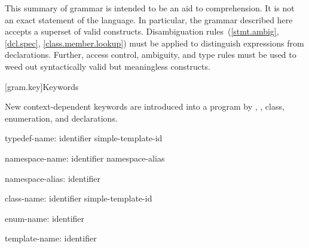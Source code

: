 
\pnum
{}%
%
This summary of \Cpp{} grammar is intended to be an aid to comprehension.
It is not an exact statement of the language.
In particular, the grammar described here accepts
a superset of valid \Cpp{} constructs.
Disambiguation rules~(\ref{stmt.ambig}, \ref{dcl.spec}, \ref{class.member.lookup})
must be applied to distinguish expressions from declarations.
Further, access control, ambiguity, and type rules must be used
to weed out syntactically valid but meaningless constructs.

[gram.key]{Keywords}

\pnum
{}%
New context-dependent keywords are introduced into a program by
,
,
class, enumeration, and
declarations.

\begin{ncbnf}
typedef-name:\br
	identifier\br
	simple-template-id
\end{ncbnf}

\begin{ncbnf}
namespace-name:\br
	identifier\br
	namespace-alias

namespace-alias:\br
	identifier
\end{ncbnf}

\begin{ncbnf}
class-name:\br
	identifier\br
	simple-template-id
\end{ncbnf}

\begin{ncbnf}
enum-name:\br
	identifier
\end{ncbnf}

\begin{ncbnf}
template-name:\br
	identifier
\end{ncbnf}

\FlushAndPrintGrammar

